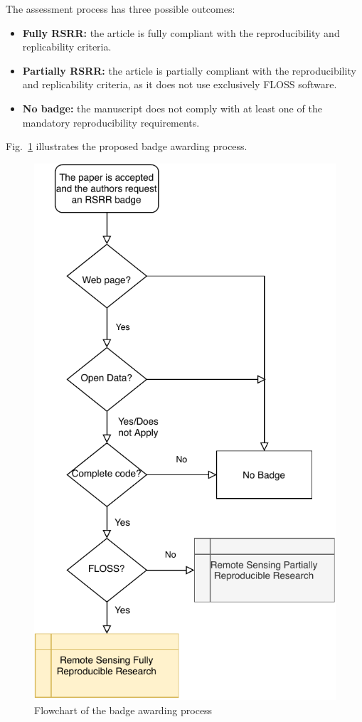 \documentclass[journal,twoside]{IEEEtran}
\providecommand{\DIFadd}[1]{{\protect\color{blue}\uwave{#1}}} %
\providecommand{\DIFaddFL}[1]{\DIFadd{#1}} %
\providecommand{\DIFaddbeginFL}{} %
\providecommand{\DIFaddendFL}{} %
\newcommand{\DIFaddincludegraphics}[2][]{{\color{blue}\fbox{\DIFOincludegraphics[#1]{#2}}}} %
\DeclareRobustCommand{\DIFaddbeginFL}{\DIFOaddbeginFL \let\includegraphics\DIFaddincludegraphics} %
\DeclareRobustCommand{\DIFaddendFL}{\DIFOaddendFL \let\includegraphics\DIFOincludegraphics} %
\begin{document}
The assessment process has three possible outcomes:
\begin{itemize}
	\item \textbf{Fully RSRR:} the article is fully compliant with the reproducibility and replicability criteria.
	\item \textbf{Partially RSRR:} the article is partially compliant with the reproducibility and replicability criteria, as it does not use exclusively FLOSS software.
	\item \textbf{No badge:} the manuscript does not comply with at least one of the mandatory reproducibility requirements.
\end{itemize}

Fig.~\ref{Fig:BadgeProcess} illustrates the proposed badge awarding process.

\begin{figure}[hbt]
	\centering
	\includegraphics[width=.7\columnwidth]{BadgeAwardingProcess}
	\caption{Flowchart of the badge awarding process\DIFaddbeginFL \DIFaddFL{.}\DIFaddendFL }\label{Fig:BadgeProcess}
\end{figure}
\end{document}
